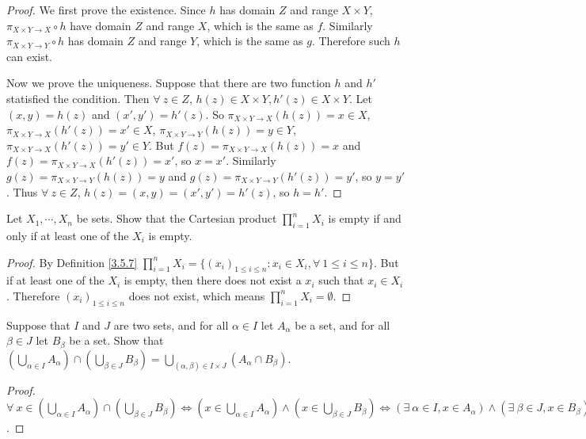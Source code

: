 \begin{proof}
We first prove the existence.
Since \(h\) has domain \(Z\) and range \(X \times Y\), \(\pi_{X \times Y \to X} \circ h\) have domain \(Z\) and range \(X\), which is the same as \(f\).
Similarly \(\pi_{X \times Y \to Y} \circ h\) has domain \(Z\) and range \(Y\), which is the same as \(g\).
Therefore such \(h\) can exist.

Now we prove the uniqueness.
Suppose that there are two function \(h\) and \(h'\) statisfied the condition.
Then \(\forall\ z \in Z\), \(h(z) \in X \times Y, h'(z) \in X \times Y\).
Let \((x, y) = h(z)\) and \((x', y') = h'(z)\).
So \(\pi_{X \times Y \to X}(h(z)) = x \in X\), \(\pi_{X \times Y \to X}(h'(z)) = x' \in X\), \(\pi_{X \times Y \to Y}(h(z)) = y \in Y\), \(\pi_{X \times Y \to X}(h'(z)) = y' \in Y\).
But \(f(z) = \pi_{X \times Y \to X}(h(z)) = x\) and \(f(z) = \pi_{X \times Y \to X}(h'(z)) = x'\), so \(x = x'\).
Similarly \(g(z) = \pi_{X \times Y \to Y}(h(z)) = y\) and \(g(z) = \pi_{X \times Y \to Y}(h'(z)) = y'\), so \(y = y'\).
Thus \(\forall\ z \in Z\), \(h(z) = (x, y) = (x', y') = h'(z)\), so \(h = h'\).
\end{proof}

\begin{exercise}\label{ex 3.5.8}
Let \(X_1, \cdots, X_n\) be sets.
Show that the Cartesian product \(\prod_{i = 1}^n X_i\) is empty if and only if at least one of the \(X_i\) is empty.
\end{exercise}

\begin{proof}
By Definition \ref{3.5.7} \(\prod_{i = 1}^n X_i = \{(x_i)_{1 \leq i \leq n} : x_i \in X_i, \forall\ 1 \leq i \leq n\}\).
But if at least one of the \(X_i\) is empty, then there does not exist a \(x_i\) such that \(x_i \in X_i\).
Therefore \((x_i)_{1 \leq i \leq n}\) does not exist, which means \(\prod_{i = 1}^n X_i = \emptyset\).
\end{proof}

\begin{exercise}\label{ex 3.5.9}
Suppose that \(I\) and \(J\) are two sets, and for all \(\alpha \in I\) let \(A_{\alpha}\) be a set, and for all \(\beta \in J\) let \(B_{\beta}\) be a set.
Show that \((\bigcup_{\alpha \in I} A_{\alpha}) \cap (\bigcup_{\beta \in J} B_{\beta}) = \bigcup_{(\alpha, \beta) \in I \times J} (A_{\alpha} \cap B_{\beta})\).
\end{exercise}

\begin{proof}
\(\forall\ x \in (\bigcup_{\alpha \in I} A_{\alpha}) \cap (\bigcup_{\beta \in J} B_{\beta}) \iff (x \in \bigcup_{\alpha \in I} A_{\alpha}) \land (x \in \bigcup_{\beta \in J} B_{\beta}) \iff (\exists\ \alpha \in I, x \in A_{\alpha}) \land (\exists\ \beta \in J, x \in B_{\beta}) \iff \exists\ \alpha \in I \ \exists\ \beta \in J, x \in A_{\alpha} \cap B_{\beta} \iff \exists\ (\alpha, \beta) \in I \times J, x \in A_{\alpha} \cap B_{\beta} \iff x \in \bigcup_{(\alpha, \beta) \in I \times J} (A_{\alpha} \cap B_{\beta})\).
\end{proof}


